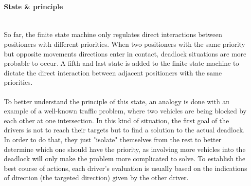\documentclass[]{spie}  %
\begin{document}
	\paragraph{State \& principle}\mbox{}\\
	So far, the finite state machine only regulates direct interactions between positioners with different priorities.
	When two positioners with the same priority but opposite movements directions enter in contact, deadlock situations are more probable to occur. A fifth and last state is added to the finite state machine to dictate the direct interaction between adjacent positioners with the same priorities.\\\\	
	To better understand the principle of this state, an analogy is done with an example of a well-known traffic problem, where two vehicles are being blocked by each other at one intersection. 
	In this kind of situation, the first goal of the drivers is not to reach their targets but to find a solution to the actual deadlock. In order to do that, they just "isolate" themselves from the rest to better determine which one should have the priority, as involving more vehicles into the deadlock will only make the problem more complicated to solve. To establish the best course of actions, each driver's evaluation is usually based on the indications of direction (the targeted direction) given by the other driver.\\
	
\end{document}
